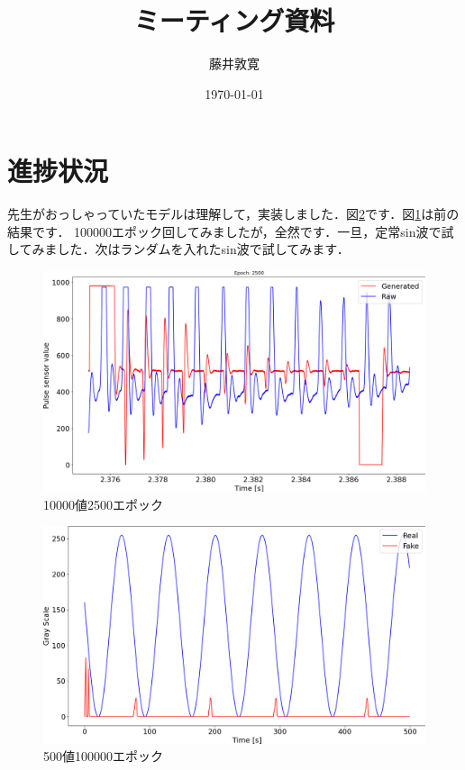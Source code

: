 \documentclass[a4j,10pt]{jarticle}
\title{ミーティング資料}
\author{藤井敦寛}
\date{\today}
\begin{document}
\maketitle

\section{進捗状況}
先生がおっしゃっていたモデルは理解して，実装しました．図\ref{fig2}です．図\ref{fig1}は前の結果です．
100000エポック回してみましたが，全然です．一旦，定常sin波で試してみました．次はランダムを入れたsin波で試してみます．


\begin{figure}[h]
  \begin{center}
    \includegraphics[width=1\textwidth]{../research/pulse/figure/10000_generated_2500epoch.png}
    \caption{10000値2500エポック}
    \label{fig1}
  \end{center}
\end{figure}

\begin{figure}[h]
  \begin{center}
    \includegraphics[width=1\textwidth]{../research/pulse/figure/500_color_100000epoch.png}
    \caption{500値100000エポック}
    \label{fig2}
  \end{center}
\end{figure}
\end{document}
